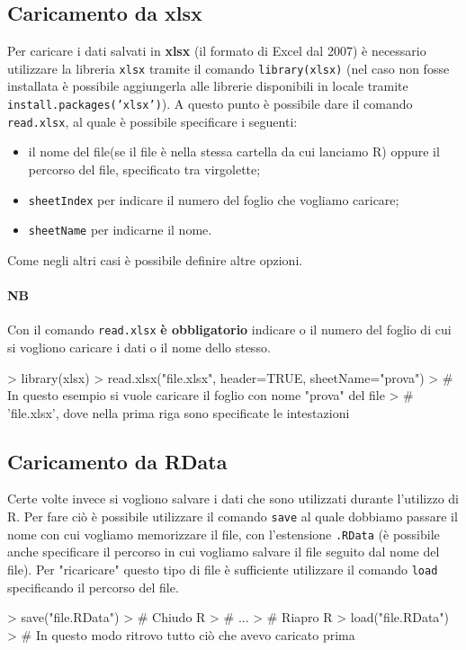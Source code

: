 \documentclass{article}
\begin{document}
\subsection{Caricamento da xlsx}
Per caricare i dati salvati in \textbf{xlsx} (il formato di Excel dal 2007) 
è necessario utilizzare la libreria \texttt{xlsx}
tramite il comando \texttt{library(xlsx)} (nel caso non fosse installata
è possibile aggiungerla alle librerie disponibili in locale tramite 
\texttt{install.packages('xlsx')}). A questo punto è possibile dare il 
comando \texttt{read.xlsx}, al quale è possibile specificare i seguenti:
\begin{itemize}
  \item il nome del file(se il file è nella stessa cartella da cui lanciamo R)
  oppure il percorso del file, specificato tra virgolette;
  \item \texttt{sheetIndex} per indicare il numero del foglio che vogliamo 
  caricare;
  \item \texttt{sheetName} per indicarne il nome.
\end{itemize}
Come negli altri casi è possibile definire altre opzioni.
\paragraph*{NB} Con il comando \texttt{read.xlsx} \textbf{è obbligatorio} 
indicare o il numero del foglio di cui si vogliono caricare i dati o
il nome dello stesso.

\begin{Schunk}
\begin{Sinput}
> library(xlsx)
> read.xlsx("file.xlsx", header=TRUE, sheetName="prova")
> # In questo esempio si vuole caricare il foglio con nome "prova" del file 
> # 'file.xlsx', dove nella prima riga sono specificate le intestazioni
\end{Sinput}
\end{Schunk}

\subsection{Caricamento da RData}
Certe volte invece si vogliono salvare i dati che sono utilizzati durante
l'utilizzo di R. Per fare ciò è possibile utilizzare il comando 
\texttt{save} al quale dobbiamo passare il nome con cui vogliamo memorizzare
il file, con l'estensione \texttt{.RData} (è possibile anche specificare il 
percorso in cui vogliamo salvare il file seguito dal nome del file). Per 
"ricaricare" questo tipo di file è sufficiente utilizzare il comando 
\texttt{load} specificando il percorso del file. 

\begin{Schunk}
\begin{Sinput}
> save("file.RData")
> # Chiudo R
> # ...
> # Riapro R
> load("file.RData")
> # In questo modo ritrovo tutto ciò che avevo caricato prima
\end{Sinput}
\end{Schunk}
\end{document}
